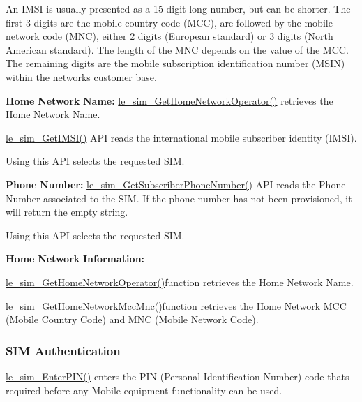 An I\+M\+S\+I is usually presented as a 15 digit long number, but can be shorter. The first 3 digits are the mobile country code (M\+C\+C), are followed by the mobile network code (M\+N\+C), either 2 digits (European standard) or 3 digits (North American standard). The length of the M\+N\+C depends on the value of the M\+C\+C. The remaining digits are the mobile subscription identification number (M\+S\+I\+N) within the network\textquotesingle{}s customer base.

{\bfseries Home} {\bfseries Network} {\bfseries Name\+:} \hyperlink{le__sim__interface_8h_a2a6676da979e90e12010e084f304660b}{le\+\_\+sim\+\_\+\+Get\+Home\+Network\+Operator()} retrieves the Home Network Name.

\hyperlink{le__sim__interface_8h_aedcba6023de6b7ec0a2cf3d2ca725b49}{le\+\_\+sim\+\_\+\+Get\+I\+M\+S\+I()} A\+P\+I reads the international mobile subscriber identity (I\+M\+S\+I).

Using this A\+P\+I selects the requested S\+I\+M.

{\bfseries Phone} {\bfseries Number\+:} \hyperlink{le__sim__interface_8h_a68a907c8b75749b0647721604a8deb12}{le\+\_\+sim\+\_\+\+Get\+Subscriber\+Phone\+Number()} A\+P\+I reads the Phone Number associated to the S\+I\+M. If the phone number has not been provisioned, it will return the empty string.

Using this A\+P\+I selects the requested S\+I\+M.

{\bfseries Home} {\bfseries Network} {\bfseries Information\+:} 
\begin{DoxyItemize}
\item \hyperlink{le__sim__interface_8h_a2a6676da979e90e12010e084f304660b}{le\+\_\+sim\+\_\+\+Get\+Home\+Network\+Operator()}function retrieves the Home Network Name.
\item \hyperlink{le__sim__interface_8h_a048b9cc4aed3f4c2fcf6ca34f40e99a9}{le\+\_\+sim\+\_\+\+Get\+Home\+Network\+Mcc\+Mnc()}function retrieves the Home Network M\+C\+C (Mobile Country Code) and M\+N\+C (Mobile Network Code).
\end{DoxyItemize}\hypertarget{c_sim_le_sim_auth}{}\subsubsection{S\+I\+M Authentication}\label{c_sim_le_sim_auth}
\hyperlink{le__sim__interface_8h_a7d9de57c8931013432cd41b26d1e7585}{le\+\_\+sim\+\_\+\+Enter\+P\+I\+N()} enters the P\+I\+N (Personal Identification Number) code that\textquotesingle{}s required before any Mobile equipment functionality can be used.

